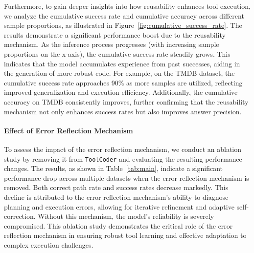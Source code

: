 Furthermore, to gain deeper insights into how reusability enhances tool execution, we analyze the cumulative success rate and cumulative accuracy across different sample proportions, as illustrated in Figure~\ref{fig:cumulative_success_rate}. The results demonstrate a significant performance boost due to the reusability mechanism. As the inference process progresses (with increasing sample proportions on the x-axis), the cumulative success rate steadily grows. This indicates that the model accumulates experience from past successes, aiding in the generation of more robust code. For example, on the TMDB dataset, the cumulative success rate approaches 90\% as more samples are utilized, reflecting improved generalization and execution efficiency. Additionally, the cumulative accuracy on TMDB consistently improves, further confirming that the reusability mechanism not only enhances success rates but also improves answer precision.


\paragraph{Effect of Error Reflection Mechanism}
To assess the impact of the error reflection mechanism, we conduct an ablation study by removing it from \texttt{ToolCoder} and evaluating the resulting performance changes. The results, as shown in Table~\ref{tab:main}, indicate a significant performance drop across multiple datasets when the error reflection mechanism is removed. Both correct path rate and success rates decrease markedly. This decline is attributed to the error reflection mechanism's ability to diagnose planning and execution errors, allowing for iterative refinement and adaptive self-correction. Without this mechanism, the model's reliability is severely compromised. This ablation study demonstrates the critical role of the error reflection mechanism in ensuring robust tool learning and effective adaptation to complex execution challenges.

